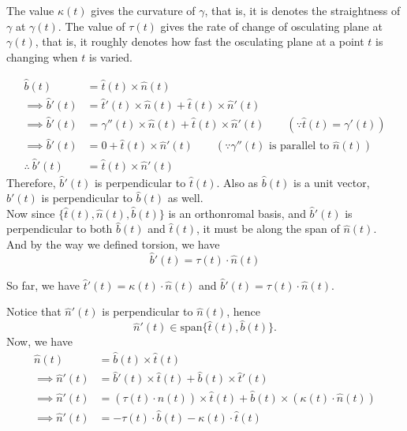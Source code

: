 \begin{note}
    The value $\kappa(t)$ gives the curvature of $\gamma$, that is, it is denotes the straightness of $\gamma$ at $\gamma(t)$. The value of $\tau(t)$ gives the rate of change of osculating plane at $\gamma(t)$, that is, it roughly denotes how fast the osculating plane at a point $t$ is changing when $t$ is varied.
\end{note}
\vspace{0.4cm}
\begin{observe}
    $$\begin{aligned}
        \hat{b}(t)&=\hat{t}(t)\times\hat{n}(t)\\ 
        \implies \hat{b}'(t) &= \hat{t}'(t)\times \hat{n}(t)+\hat{t}(t)\times \hat{n}'(t)\\
        \implies \hat{b}'(t)&=\gamma''(t)\times \hat{n}(t)+\hat{t}(t)\times \hat{n}'(t)\quad\quad(\because \hat{t}(t)=\gamma'(t))\\
        \implies \hat{b}'(t)&=0+\hat{t}(t)\times \hat{n}'(t)\quad\quad(\because \gamma''(t)\text{ is parallel to }\hat{n}(t))\\ 
        \therefore~\hat{b}'(t)&=\hat{t}(t)\times \hat{n}'(t)
    \end{aligned}$$
    Therefore, $\hat{b}'(t)$ is perpendicular to $\hat{t}(t)$. Also as $\hat{b}(t)$ is a unit vector, $\hat{b}'(t)$ is perpendicular to $\hat{b}(t)$ as well.\\
    Now since $\{\hat{t}(t),\hat{n}(t),\hat{b}(t)\}$ is an orthonromal basis, and $\hat{b}'(t)$ is perpendicular to both $\hat{b}(t)$ and $\hat{t}(t)$, it must be along the span of $\hat{n}(t)$.\\
    And by the way we defined torsion, we have $$\hat{b}'(t)=\tau(t)\cdot \hat{n}(t)$$
\end{observe}
\begin{note}
    So far, we have $\hat{t}'(t)=\kappa(t)\cdot \hat{n}(t)$ and $\hat{b}'(t)=\tau(t)\cdot \hat{n}(t)$.
\end{note}
\begin{observe}
    Notice that $\hat{n}'(t)$ is perpendicular to $\hat{n}(t)$, hence $$\hat{n}'(t)\in\text{span}\{\hat{t}(t),\hat{b}(t)\}.$$
    Now, we have 
    $$\begin{aligned}
        \hat{n}(t)&=\hat{b}(t)\times \hat{t}(t)\\ 
        \implies \hat{n}'(t)&=\hat{b}'(t)\times \hat{t}(t)+\hat{b}(t)\times \hat{t}'(t)\\
        \implies \hat{n}'(t)&=(\tau(t)\cdot \hat{n}(t))\times \hat{t}(t)+\hat{b}(t)\times (\kappa(t)\cdot \hat{n}(t))\\
        \implies \hat{n}'(t)&=-\tau(t)\cdot\hat{b}(t)-\kappa(t)\cdot\hat{t}(t)
    \end{aligned}$$
\end{observe}
